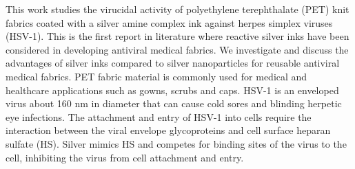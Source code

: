 \documentclass[10pt,letterpaper]{article}
\begin{document}






This work studies the virucidal activity of
polyethylene terephthalate (PET) knit fabrics coated with a silver amine complex ink \cite{Walker:12}
against herpes simplex viruses (HSV-1). This is the first report in literature where reactive silver inks have been considered in developing antiviral medical fabrics. We investigate and discuss the advantages of silver inks compared to silver nanoparticles for reusable antiviral medical fabrics. 
PET fabric material is commonly used for medical and healthcare applications such as gowns, scrubs and caps. \cite{Rigby:97} 
HSV-1 is an enveloped virus about 160 nm in diameter that can cause cold sores and blinding herpetic eye infections.\cite{wald:07} 
The attachment and entry of HSV-1 into cells require the interaction between the viral envelope glycoproteins and cell surface heparan sulfate (HS).\cite{baram-pinto_2009,akbarzadeh:2018} Silver mimics HS and competes for binding sites of the virus to the cell, inhibiting the virus from cell attachment and entry.\cite{baram-pinto_2009,Galdiero:11}
\end{document}

